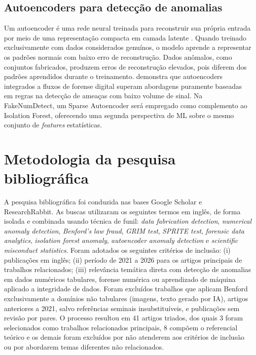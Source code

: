 \documentclass[
    12pt,                %
    openright,           %
    oneside,             %
    a4paper,             %
    english,             %
    brazil               %
]{abntex2}
\begin{document}
\subsection{Autoencoders para detecção de anomalias}

Um autoencoder é uma rede neural treinada para reconstruir sua própria entrada por meio de uma representação compacta em camada latente \cite{Ng2011}. Quando treinado exclusivamente com dados considerados genuínos, o modelo aprende a representar os padrões normais com baixo erro de reconstrução. Dados anômalos, como conjuntos fabricados, produzem erros de reconstrução elevados, pois diferem dos padrões aprendidos durante o treinamento.
 demonstra que autoencoders integrados a fluxos de forense digital superam abordagens puramente baseadas em regras na detecção de ameaças com baixo volume de sinal. Na FakeNumDetect, um Sparse Autoencoder será empregado como complemento ao Isolation Forest, oferecendo uma segunda perspectiva de ML sobre o mesmo conjunto de \textit{features} estatísticas.

\section{Metodologia da pesquisa bibliográfica}
\label{sec:metodologia_pesquisa}

A pesquisa bibliográfica foi conduzida nas bases Google Scholar e ResearchRabbit. As buscas utilizaram os seguintes termos em inglês, de forma isolada e combinada usando técnica de funil: \textit{data fabrication detection}, \textit{numerical anomaly detection}, \textit{Benford's law fraud}, \textit{GRIM test}, \textit{SPRITE test}, \textit{forensic data analytics}, \textit{isolation forest anomaly}, \textit{autoencoder anomaly detection} e \textit{scientific misconduct statistics}.
Foram adotados os seguintes critérios de inclusão: (i) publicações em inglês; (ii) período de 2021 a 2026 para os artigos principais de trabalhos relacionados; (iii) relevância temática direta com detecção de anomalias em dados numéricos tabulares, forense numérica ou aprendizado de máquina aplicado a integridade de dados. Foram excluídos trabalhos que aplicam Benford exclusivamente a domínios não tabulares (imagens, texto gerado por IA), 
artigos anteriores a 2021, salvo referências seminais insubstituíveis, e publicações sem revisão por pares.
O processo resultou em 41 artigos triados, dos quais 3 foram selecionados como trabalhos relacionados principais, 8 compõem o referencial teórico e os demais foram excluídos por não atenderem aos critérios de inclusão ou por abordarem temas diferentes não relacionados.
\end{document}
